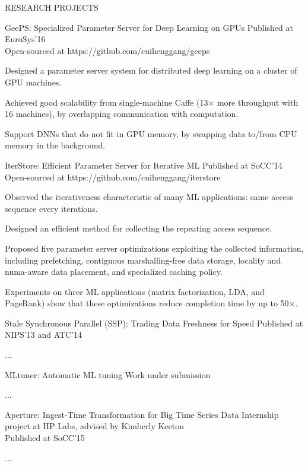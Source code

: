 \documentclass{resume} %
\begin{document}
\begin{rSection}{RESEARCH PROJECTS}

\begin{rSubsection}{GeePS: Specialized Parameter Server for Deep Learning on GPUs}{}
{Published at EuroSys'16\\
Open-sourced at https://github.com/cuihenggang/geeps}{}
\item Designed a parameter server system for distributed deep learning on a cluster of GPU machines.
\item Achieved good scalability from single-machine Caffe (13$\times$ more throughput with 16 machines), by overlapping communication with computation.
\item Support DNNs that do not fit in GPU memory, by swapping data to/from CPU memory in the background.
\end{rSubsection}

\begin{rSubsection}{IterStore: Efficient Parameter Server for Iterative ML}{}
{Published at SoCC'14\\
Open-sourced at https://github.com/cuihenggang/iterstore}{}
\item Observed the iterativeness characteristic of many ML applications: same access sequence every iterations.
\item Designed an efficient method for collecting the repeating access sequence.
\item Proposed five parameter server optimizations exploiting the collected information, including prefetching, contiguous marshalling-free data storage, locality and numa-aware data placement, and specialized caching policy.
\item Experiments on three ML applications (matrix factorization, LDA, and PageRank) show that these optimizations reduce completion time by up to 50$\times$.
\end{rSubsection}

\begin{rSubsection}{Stale Synchronous Parallel (SSP): Trading Data Freshness for Speed}{}
{Published at NIPS'13 and ATC'14}{}
\item ...
\end{rSubsection}

\begin{rSubsection}{MLtuner: Automatic ML tuning}{}
{Work under submission}{}
\item ...
\end{rSubsection}

\begin{rSubsection}{Aperture: Ingest-Time Transformation for Big Time Series Data}{}
{Internship project at HP Labs, advised by Kimberly Keeton\\
Published at SoCC'15}{}
\item ...
\end{rSubsection}

\end{rSection} 
\end{document}
